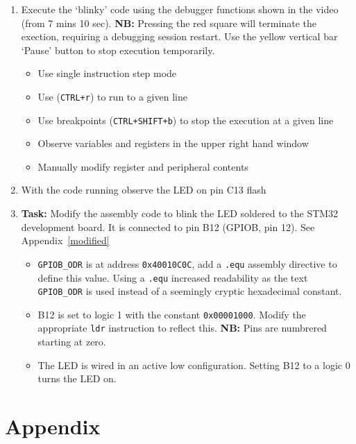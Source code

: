 \documentclass{UoNMCHA}
\numberwithin{equation}{section}
\begin{document}
\begin{enumerate}
    \item Execute the `blinky' code using the debugger functions shown in the video (from 7 mins 10 sec). \textbf{NB:} Pressing the red square will terminate the exection, requiring a debugging session restart. Use the yellow vertical bar `Pause' button to stop execution temporarily.
    
    \begin{itemize}
        \item Use single instruction step mode
        \item Use (\texttt{CTRL+r}) to run to a given line
        \item Use breakpoints (\texttt{CTRL+SHIFT+b}) to stop the execution at a given line
        \item Observe variables and registers in the upper right hand window
        \item Manually modify register and peripheral contents
    \end{itemize}
    
    \item With the code running observe the LED on pin C13 flash
    
    \item \textbf{Task:} Modify the assembly code to blink the LED soldered to the STM32 development board. It is connected to pin B12 (GPIOB, pin 12). See Appendix~\ref{modified}
    \begin{itemize}
        \item \texttt{GPIOB\_ODR} is at address \texttt{0x40010C0C}, add a \texttt{.equ} assembly directive to define this value. Using a \texttt{.equ} increased readability as the text \texttt{GPIOB\_ODR} is used instead of a seemingly cryptic hexadecimal constant.
        \item B12 is set to logic 1 with the constant \texttt{0x00001000}. Modify the appropriate \texttt{ldr} instruction to reflect this. \textbf{NB:} Pins are numbrered starting at zero.
        
        \item The LED is wired in an active low configuration. Setting B12 to a logic 0 turns the LED on.
    \end{itemize}
\end{enumerate}

\pagebreak

\section{Appendix}
\end{document}
